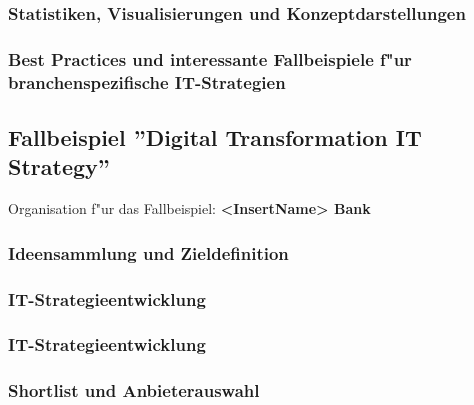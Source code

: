 \documentclass[a4paper, 12pt]{article} %
\begin{document}
\subsubsection{Statistiken, Visualisierungen und Konzeptdarstellungen}


\subsubsection{Best Practices und interessante Fallbeispiele f"ur branchenspezifische IT-Strategien}


\newpage
\subsection{Fallbeispiel ''Digital Transformation IT Strategy''}
\label{subsec:Fallbeispiel}
Organisation f"ur das Fallbeispiel: \textbf{<InsertName> Bank}

\subsubsection{Ideensammlung und Zieldefinition}


\subsubsection{IT-Strategieentwicklung}




\subsubsection{IT-Strategieentwicklung}



\subsubsection{Shortlist und Anbieterauswahl}









\end{document}

